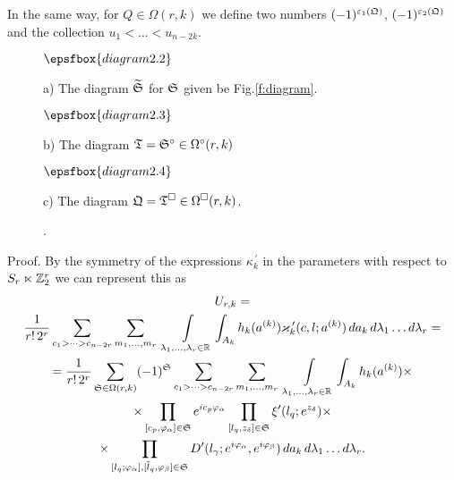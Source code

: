 \documentclass{article}
\def\sm{\smallskip}
\begin{document}
In the same way, for $Q\in \Omega(r,k)$ we define two numbers
$(-1)^{\varepsilon_1(\mathfrak Q)}$, $(-1)^{\varepsilon_2(\mathfrak Q)}$ and the collection
$u_1<\dots<u_{n-2k}$.

\sm







\begin{figure}
\qquad\qquad
$
\epsfbox{diagram2.2}
$

a) The diagram $\widetilde {\mathfrak S}$ for $\mathfrak S$ given be Fig.\ref{f:diagram}.

\bigskip

\qquad\qquad
$
\epsfbox{diagram2.3}
$

b) The diagram $\mathfrak T=\mathfrak S^\circ\in\Omega^\circ(r,k)$

\bigskip

\qquad\qquad
$
\epsfbox{diagram2.4}
$

c) The diagram $\mathfrak Q=\mathfrak T^\square\in\Omega^\square(r,k)$.
\caption{.\label{fig:diagram-2}}
\end{figure}

{\sc Proof.}
By the symmetry of the expressions $\kappa^{\,\prime}_k$ in the parameters  with respect to
$S_r\ltimes {\mathbb Z}_2^r$  we can 
represent this as
\begin{multline}
U_{r,k}=\\
\frac 1{r!\,2^r}
\sum_{c_1>\dots>c_{n-2r}}
\sum_{m_1,\dots,m_r}\,\,
\int\limits_{\lambda_1,\dots,\lambda_r\in{\mathbb R }}
\int_{A_k} h_k(a^{(k)})
 \varkappa^{\,\prime}_k(c,l;a^{(k)})
 \,da_k
\,d\lambda_1\dots d\lambda_r
=\\=
\frac 1{r!\,2^r}
\sum_{\mathfrak S\in \Omega(r,k)}
(-1)^{\mathfrak S}
\sum_{c_1>\dots>c_{n-2r}}
\sum_{m_1,\dots,m_r}\,\,
\int\limits_{\lambda_1,\dots,\lambda_r\in{\mathbb R }}
\int_{A_k} h_k(a^{(k)})
\times\\\times
\prod_{[c_p,\varphi_\alpha]\in \mathfrak S} e^{i c_p\varphi_\alpha}
\prod_{[l_q,z_\delta]\in \mathfrak S}
\xi'(l_q; e^{z_\delta})
\times \\ \times
\prod_{[l_q;\varphi_\alpha], [\overline l_q,\varphi_\beta]\in\mathfrak S}
D'(l_\gamma;e^{i\varphi_\alpha}, e^{i\varphi_\beta})
\,da_k
\,d\lambda_1\dots d\lambda_r
\label{eq:long}
.\end{multline}
\end{document}
